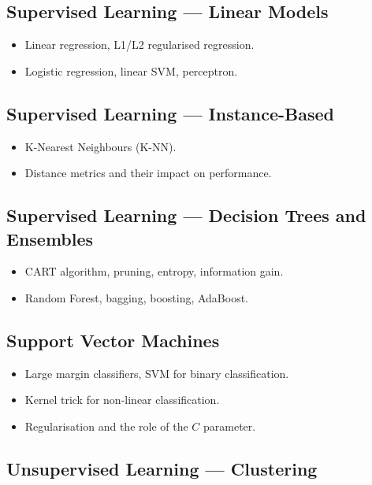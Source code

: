 \documentclass[11pt,a4paper]{article}
\theoremstyle{definition}
\theoremstyle{plain}
\theoremstyle{remark}
\begin{document}
\subsection{Supervised Learning --- Linear Models}

\begin{itemize}
    \item Linear regression, L1/L2 regularised regression.
    \item Logistic regression, linear SVM, perceptron.
\end{itemize}

\subsection{Supervised Learning --- Instance-Based}

\begin{itemize}
    \item K-Nearest Neighbours (K-NN).
    \item Distance metrics and their impact on performance.
\end{itemize}

\subsection{Supervised Learning --- Decision Trees and Ensembles}

\begin{itemize}
    \item CART algorithm, pruning, entropy, information gain.
    \item Random Forest, bagging, boosting, AdaBoost.
\end{itemize}

\subsection{Support Vector Machines}

\begin{itemize}
    \item Large margin classifiers, SVM for binary classification.
    \item Kernel trick for non-linear classification.
    \item Regularisation and the role of the $C$ parameter.
\end{itemize}

\subsection{Unsupervised Learning --- Clustering}
\end{document}
